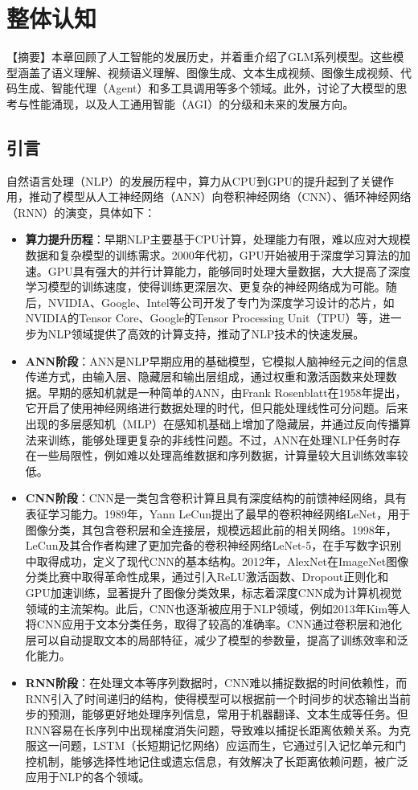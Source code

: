 \chapter{整体认知}

【摘要】本章回顾了人工智能的发展历史，并着重介绍了GLM系列模型。这些模型涵盖了语义理解、视频语义理解、图像生成、文本生成视频、图像生成视频、代码生成、智能代理（Agent）和多工具调用等多个领域。此外，讨论了大模型的思考与性能涌现，以及人工通用智能（AGI）的分级和未来的发展方向。

\section{引言}

自然语言处理（NLP）的发展历程中，算力从CPU到GPU的提升起到了关键作用，推动了模型从人工神经网络（ANN）向卷积神经网络（CNN）、循环神经网络（RNN）的演变，具体如下：

\begin{itemize}
	\item \textbf{算力提升历程}：早期NLP主要基于CPU计算，处理能力有限，难以应对大规模数据和复杂模型的训练需求。2000年代初，GPU开始被用于深度学习算法的加速。GPU具有强大的并行计算能力，能够同时处理大量数据，大大提高了深度学习模型的训练速度，使得训练更深层次、更复杂的神经网络成为可能。随后，NVIDIA、Google、Intel等公司开发了专门为深度学习设计的芯片，如NVIDIA的Tensor Core、Google的Tensor Processing Unit（TPU）等，进一步为NLP领域提供了高效的计算支持，推动了NLP技术的快速发展。
	\item \textbf{ANN阶段}：ANN是NLP早期应用的基础模型，它模拟人脑神经元之间的信息传递方式，由输入层、隐藏层和输出层组成，通过权重和激活函数来处理数据。早期的感知机就是一种简单的ANN，由Frank Rosenblatt在1958年提出，它开启了使用神经网络进行数据处理的时代，但只能处理线性可分问题。后来出现的多层感知机（MLP）在感知机基础上增加了隐藏层，并通过反向传播算法来训练，能够处理更复杂的非线性问题。不过，ANN在处理NLP任务时存在一些局限性，例如难以处理高维数据和序列数据，计算量较大且训练效率较低。
	\item \textbf{CNN阶段}：CNN是一类包含卷积计算且具有深度结构的前馈神经网络，具有表征学习能力。1989年，Yann LeCun提出了最早的卷积神经网络LeNet，用于图像分类，其包含卷积层和全连接层，规模远超此前的相关网络。1998年，LeCun及其合作者构建了更加完备的卷积神经网络LeNet-5，在手写数字识别中取得成功，定义了现代CNN的基本结构。2012年，AlexNet在ImageNet图像分类比赛中取得革命性成果，通过引入ReLU激活函数、Dropout正则化和GPU加速训练，显著提升了图像分类效果，标志着深度CNN成为计算机视觉领域的主流架构。此后，CNN也逐渐被应用于NLP领域，例如2013年Kim等人将CNN应用于文本分类任务，取得了较高的准确率。CNN通过卷积层和池化层可以自动提取文本的局部特征，减少了模型的参数量，提高了训练效率和泛化能力。
	\item \textbf{RNN阶段}：在处理文本等序列数据时，CNN难以捕捉数据的时间依赖性，而RNN引入了时间递归的结构，使得模型可以根据前一个时间步的状态输出当前步的预测，能够更好地处理序列信息，常用于机器翻译、文本生成等任务。但RNN容易在长序列中出现梯度消失问题，导致难以捕捉长距离依赖关系。为克服这一问题，LSTM（长短期记忆网络）应运而生，它通过引入记忆单元和门控机制，能够选择性地记住或遗忘信息，有效解决了长距离依赖问题，被广泛应用于NLP的各个领域。
\end{itemize}

